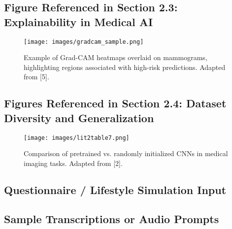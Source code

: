 \documentclass[12pt]{article}
\begin{document}
\subsection{Figure Referenced in Section 2.3: Explainability in Medical AI}

\begin{figure}[H]
    \centering
    \texttt{[image: images/gradcam\_sample.png]}
    \caption{Example of Grad-CAM heatmaps overlaid on mammograms, highlighting regions associated with high-risk predictions. Adapted from [5].}
    \label{fig:gradcam}
\end{figure}

\subsection{Figures Referenced in Section 2.4: Dataset Diversity and Generalization}

\begin{figure}[H]
    \centering
    \texttt{[image: images/lit2table7.png]}
    \caption{Comparison of pretrained vs. randomly initialized CNNs in medical imaging tasks. Adapted from [2].}
    \label{fig:lit2table7}
\end{figure}

\subsection{Questionnaire / Lifestyle Simulation Input}
\subsection{Sample Transcriptions or Audio Prompts}

\newpage
\end{document}
